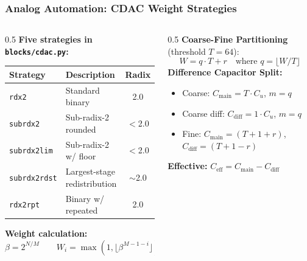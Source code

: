 \begin{frame}
  \frametitle{Analog Automation: CDAC Weight Strategies}
  \begin{columns}
    \begin{column}{0.5\textwidth}
      \small
      \textbf{Five strategies in \texttt{blocks/cdac.py}:}
      \vspace{0.5em}
      \begin{tabular}{l|l|c}
        \hline
        \textbf{Strategy} & \textbf{Description} & \textbf{Radix} \\
        \hline
        \texttt{rdx2} & Standard binary & 2.0 \\
        \texttt{subrdx2} & Sub-radix-2 rounded & $<$2.0 \\
        \texttt{subrdx2lim} & Sub-radix-2 w/ floor & $<$2.0 \\
        \texttt{subrdx2rdst} & Largest-stage redistribution & $\sim$2.0 \\
        \texttt{rdx2rpt} & Binary w/ repeated & 2.0 \\
        \hline
      \end{tabular}
      \vspace{1em}

      \textbf{Weight calculation:}
      \[
        \beta = 2^{N/M} \qquad W_i = \max(1, \lfloor \beta^{M-1-i} \rfloor)
      \]
    \end{column}
    \begin{column}{0.5\textwidth}
      \small
      \textbf{Coarse-Fine Partitioning} (threshold $T=64$):
      \[
        W = q \cdot T + r \quad \text{where } q = \lfloor W/T \rfloor
      \]
      \vspace{0.5em}
      \textbf{Difference Capacitor Split:}
      \begin{itemize}
        \item Coarse: $C_{\mathrm{main}} = T \cdot C_u$, $m = q$
        \item Coarse diff: $C_{\mathrm{diff}} = 1 \cdot C_u$, $m = q$
        \item Fine: $C_{\mathrm{main}} = (T+1+r)$, \\ $C_{\mathrm{diff}} = (T+1-r)$
      \end{itemize}
      \vspace{0.5em}
      \textbf{Effective:} $C_{\mathrm{eff}} = C_{\mathrm{main}} - C_{\mathrm{diff}}$
    \end{column}
  \end{columns}
\end{frame}


